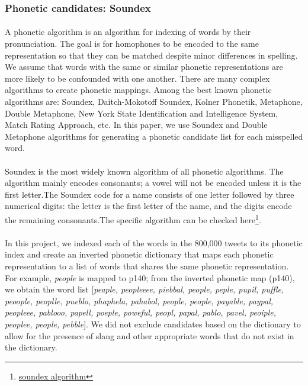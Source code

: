 \documentclass[twocolumn,10pt]{article}
\begin{document}
\subsubsection*{Phonetic candidates: Soundex}
\paragraph{} A phonetic algorithm is an algorithm for indexing of words by their pronunciation. The goal is for homophones to be encoded to the same representation so that they can be matched despite minor differences in spelling. We assume that words with the same or similar phonetic representations are more likely to be confounded with one another. There are many complex algorithms to create phonetic mappings. Among the best known phonetic algorithms are: Soundex, Daitch-Mokotoff Soundex, Kolner Phonetik, Metaphone, Double Metaphone, New York State Identification and Intelligence System, Match Rating Approach, etc. In this paper, we use Soundex and Double Metaphone algorithms for generating a phonetic candidate list for each misspelled word.
\paragraph{} Soundex is the most widely known algorithm of all phonetic algorithms. The algorithm mainly encodes consonants; a vowel will not be encoded unless it is the first letter.The Soundex code for a name consists of one letter followed by three numerical digits: the letter is the first letter of the name, and the digits encode the remaining consonants.The specific algorithm can be checked here\footnote{\href{http://www.sound-ex.com/soundex_method.htm}{soundex algorithm}}.
\paragraph{} In this project, we indexed each of the words in the 800,000 tweets to its phonetic index and create an inverted phonetic dictionary that maps each phonetic representation to a list of words that shares the same phonetic representation. For example, \textit{people} is mapped to p140; from the inverted phonetic map (p140), we obtain the word list [\textit{peaple, peopleeee,  piebbal, people, peple, pupil, puffle, peoople, peoplle, pueblo, phaphela, pahabol, people, people, payable, paypal, peopleee, pablooo, papell, poeple, poweful, peopl, papal, pablo, pavel, peoiple, peoplee, people, pebble}]. We did not exclude candidates based on the dictionary to allow for the presence of slang and other appropriate words that do not exist in the dictionary.
\end{document}
